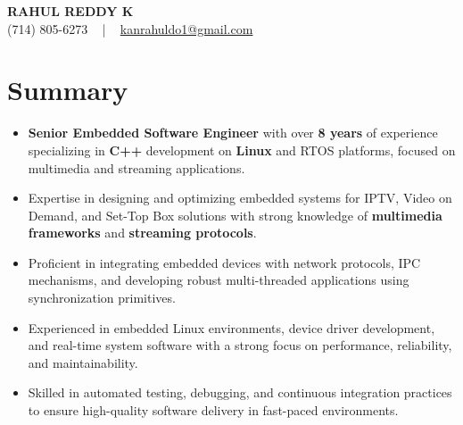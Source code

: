 \documentclass[letterpaper,11pt]{article}
\newcommand{\resumeItem}[1]{
  \item\footnotesize{
    {#1 \vspace{-2pt}}
  }
}
\newcommand{\resumeItemListStart}{\begin{itemize}[leftmargin=*]}
\newcommand{\resumeItemListEnd}{\end{itemize}\vspace{-5pt}}
\begin{document}
\begin{center}
    {\fontsize{14pt}{12pt}\selectfont \textbf{\MakeUppercase{Rahul Reddy K}}}\\ \vspace{2pt}
    \fontsize{10pt}{12pt}\selectfont (714) 805-6273 ~ | ~ \href{mailto:kanrahuldo1@gmail.com}{kanrahuldo1@gmail.com}~
    \vspace{-8pt}
\end{center}

\section{Summary}
\fontsize{9pt}{10pt}\selectfont
\resumeItemListStart
    \resumeItem{\textbf{Senior Embedded Software Engineer} with over \textbf{8 years} of experience specializing in \textbf{C++} development on \textbf{Linux} and RTOS platforms, focused on multimedia and streaming applications.}
    \resumeItem{Expertise in designing and optimizing embedded systems for IPTV, Video on Demand, and Set-Top Box solutions with strong knowledge of \textbf{multimedia frameworks} and \textbf{streaming protocols}.}
    \resumeItem{Proficient in integrating embedded devices with network protocols, IPC mechanisms, and developing robust multi-threaded applications using synchronization primitives.}
    \resumeItem{Experienced in embedded Linux environments, device driver development, and real-time system software with a strong focus on performance, reliability, and maintainability.}
    \resumeItem{Skilled in automated testing, debugging, and continuous integration practices to ensure high-quality software delivery in fast-paced environments.}
\resumeItemListEnd
\vspace{-6pt}
\end{document}
